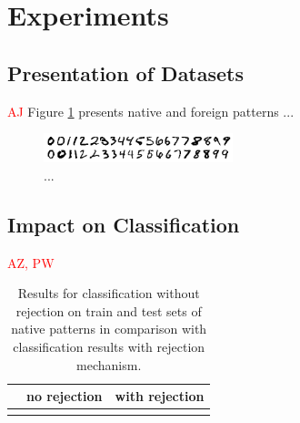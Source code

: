 \documentclass{llncs}
\begin{document}
\section{Experiments}
  \label{sec:Experiments}

\subsection{Presentation of Datasets}
\textcolor{red} {AJ}
Figure \ref{fig:nativeforeignpatterns} presents native and foreign patterns ...

\begin{figure}[!t]
  \centering
  \includegraphics[width=0.49\textwidth]{_Figures/native}
  \caption{...}
\label{fig:nativeforeignpatterns}
\end{figure}


\subsection{Impact on Classification}
\textcolor{red} {AZ, PW}

\begin{table}[t]
\centering
\caption{Results for classification without rejection on train and test sets of native patterns in comparison with classification results with rejection mechanism. }
\vspace{3pt}
\setlength{\tabcolsep}{6pt}
\renewcommand{\arraystretch}{1}
\begin{tabular}{|r||cc|cc|}
\hline
& \multicolumn{2}{c|}{no rejection} & \multicolumn{2}{c|}{with rejection}  \\
\hline
&&&&\\
\hline
\end{tabular}
\vspace{12pt}
\label{tab:NativeNoForeign}
\end{table}


\end{document}
